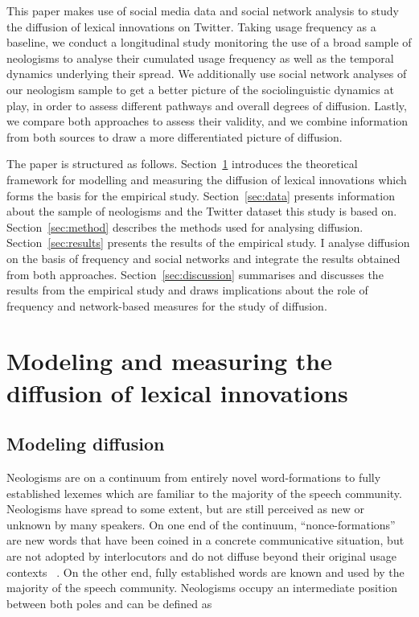 \documentclass[
  a4paper,
  abstract=on,
  captions=tableabove
  ]{scrartcl}
\begin{document}
This paper makes use of social media data and social network analysis to study the diffusion of lexical innovations on Twitter. Taking usage frequency as a baseline, we conduct a longitudinal study monitoring the use of a broad sample of neologisms to analyse their cumulated usage frequency as well as the temporal dynamics underlying their spread. We additionally use social network analyses of our neologism sample to get a better picture of the sociolinguistic dynamics at play, in order to assess different pathways and overall degrees of diffusion. Lastly, we compare both approaches to assess their validity, and we combine information from both sources to draw a more differentiated picture of diffusion.

The paper is structured as follows. Section~\ref{sec:model-measure-diff} introduces the theoretical framework for modelling and measuring the diffusion of lexical innovations which forms the basis for the empirical study. Section~\ref{sec:data} presents information about the sample of neologisms and the Twitter dataset this study is based on. Section~\ref{sec:method} describes the methods used for analysing diffusion. Section~\ref{sec:results} presents the results of the empirical study. I analyse diffusion on the basis of frequency and social networks and integrate the results obtained from both approaches. Section~\ref{sec:discussion} summarises and discusses the results from the empirical study and draws implications about the role of frequency and network-based measures for the study of diffusion.


\section{Modeling and measuring the diffusion of lexical innovations}
  \label{sec:model-measure-diff}

  \subsection{Modeling diffusion}

    Neologisms are on a continuum from entirely novel word-formations to fully established lexemes which are familiar to the majority of the speech community. Neologisms have spread to some extent, but are still perceived as new or unknown by many speakers. On one end of the continuum, \enquote{nonce-formations} are new words that have been coined in a concrete communicative situation, but are not adopted by interlocutors and do not diffuse beyond their original usage contexts~ \parencite{Hohenhaus1996AdhocWortbildungTerminologie}. On the other end, fully established words are known and used by the majority of the speech community. Neologisms occupy an intermediate position between both poles and can be defined as
\end{document}
